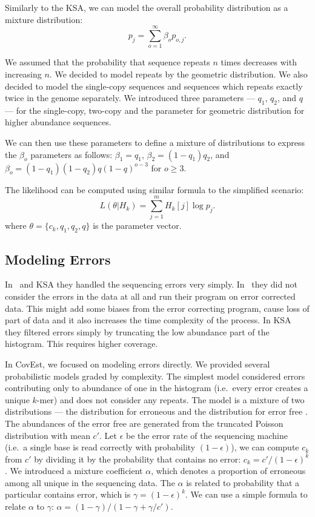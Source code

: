 Similarly to the KSA, we can model the overall probability distribution as a mixture distribution:
$$p_j = \sum_{o=1}^\infty \beta_o p_{o,j}.$$

We assumed that the probability that sequence repeats $n$ times decreases with increasing $n$. We decided to model repeats by the geometric distribution. We also decided to model the single-copy sequences and sequences which repeats exactly twice in the genome separately. We introduced three parameters --- $q_1$, $q_2$, and $q$ --- for the single-copy, two-copy and the parameter for geometric distribution for higher abundance sequences.

We can then use these parameters to define a mixture of distributions to express the $\beta_o$ parameters as follows:
$\beta_1 = q_1$, $\beta_2 = (1-q_1) q_2$, and $\beta_o =
(1-q_1)(1-q_2)q{(1-q)}^{o-3}$ for $o\ge 3$.

The likelihood can be computed using similar formula to the simplified scenario:
$$L(\theta | H_k) = \sum_{j=1}^m H_k[j] \log p_j.$$
where $\theta = \{c_k, q_1, q_2, q\}$ is the parameter vector.

\subsection{Modeling Errors}

In~\cite{waterman} and KSA\cite{williams} they handled the sequencing errors very simply. In~\cite{waterman} they did not consider the errors in the data at all and run their program on error corrected data. This might add some biases from the error correcting program, cause loss of part of data and it also increases the time complexity of the process. In KSA they filtered errors simply by truncating the low abundance part of the histogram. This requires higher coverage.

In CovEst\cite{covest}, we focused on modeling errors directly. We provided several probabilistic models graded by complexity.
The simplest model considered errors contributing only to abundance of one in the histogram (i.e.\ every error creates a unique $k$-mer) and does not consider any repeats.
The model is a mixture of two distributions --- the distribution for erroneous \kmers and the distribution for error free \kmers. The abundances of the error free \kmers are generated from the truncated Poisson distribution with mean $c'$.
Let $\epsilon$ be the error rate of the sequencing machine (i.e.\ a single base is read correctly with probability $(1-\epsilon)$), we can compute $c_k$ from $c'$ by dividing it by the probability that \kmer contains no error: $c_k = c'/{(1-\epsilon)}^k$.
We introduced a mixture coefficient $\alpha$, which denotes a proportion of erroneous \kmers among all unique \kmers in the sequencing data. The $\alpha$ is related to probability that a particular \kmer contains error, which is $\gamma = {(1-\epsilon)}^k$.
We can use a simple formula to relate $\alpha$ to $\gamma$: $\alpha = (1-\gamma)/(1-\gamma+\gamma/c')$\cite{covest}.

